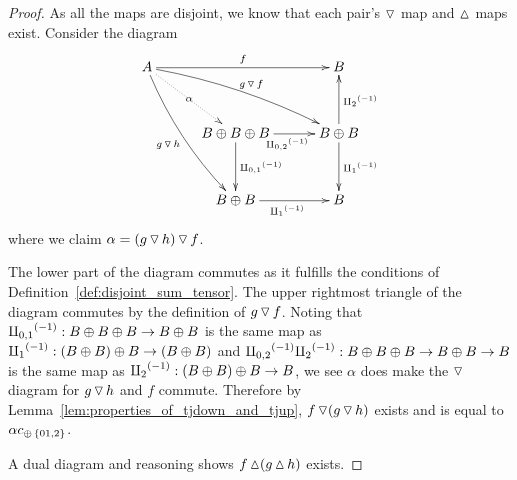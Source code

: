 \begin{proof}
  As all the maps are disjoint, we know that each pair's $\operatorname{\triangledown}$ map and $\operatorname{\vartriangle}$ maps
  exist.  Consider the diagram
  \[
    \xymatrix@C+5pt@R+10pt{
      A \ar@/_/[ddr]_{g\tjdown h} \ar@/^/[drr]^{g\tjdown f} \ar@{.>}[dr]|-{\alpha} \ar[rr]^{f}
        & & B \\
        & B\+B\+B \ar[d]^{\icp{0,1}} \ar[r]_{\icp{0,2}} & B\+B \ar[d]^{\icpa} \ar[u]_{\icpb} \\
        & B\+B \ar[r]_{\icpa} & B
    }
  \]
  where we claim $\alpha = (g\operatorname{\triangledown} h)\operatorname{\triangledown} f$.

  The lower part of the diagram commutes as it fulfills the conditions of
  Definition~\ref{def:disjoint_sum_tensor}. The upper rightmost triangle of the diagram commutes by
  the definition of $g\operatorname{\triangledown} f$. Noting that ${\amalg_{0,1}}^{(-1)}:B\oplus B\oplus B \to B\oplus B$ is the same map as
  ${\amalg_{1}}^{(-1)}:(B\oplus B)\oplus B\to (B\oplus B)$ and ${\amalg_{0,2}}^{(-1)} {\amalg_{2}}^{(-1)}:B\oplus B\oplus B \to B\oplus B \to B$ is the same map as
  ${\amalg_{2}}^{(-1)}:(B\oplus B)\oplus B\to B$, we see $\alpha$ does make the $\operatorname{\triangledown}$ diagram for $g\operatorname{\triangledown} h$ and $f$
  commute. Therefore by Lemma~\ref{lem:properties_of_tjdown_and_tjup}, $f\operatorname{\triangledown}(g\operatorname{\triangledown} h)$
  exists and is equal to $\alpha c_{\oplus\,\{01,2\}}$.

  A dual diagram and reasoning shows $f\operatorname{\vartriangle}(g\operatorname{\vartriangle} h)$ exists.
\end{proof}

